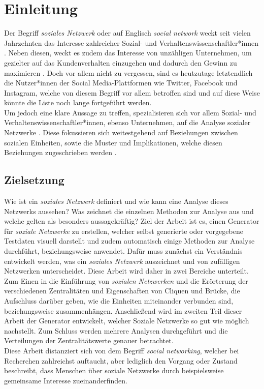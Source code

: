 \chapter{Einleitung}\label{ch:einleitung}
Der Begriff \textit{soziales Netzwerk} oder auf Englisch \textit{social network} weckt seit vielen Jahrzehnten das Interesse zahlreicher Sozial- und Verhaltenswissenschaftler*innen \cite{SNAIntroduction}. Neben diesen, weckt es zudem das Interesse von unzähligen Unternehmen, um gezielter auf das Kundenverhalten einzugehen und dadurch den Gewinn zu maximieren \cite{CompanySNA}. Doch vor allem nicht zu vergessen, sind es heutzutage letztendlich die Nutzer*innen der Social Media-Plattformen wie Twitter, Facebook und Instagram, welche von diesem Begriff vor allem betroffen sind und auf diese Weise könnte die Liste noch lange fortgeführt werden.\\
Um jedoch eine klare Aussage zu treffen, spezialisieren sich vor allem Sozial- und Verhaltenswissenschaftler*innen, ebenso Unternehmen, auf die Analyse sozialer Netzwerke \cite{SNAIntroduction, CompanySNA}. Diese fokussieren sich weitestgehend auf Beziehungen zwischen sozialen Einheiten, sowie die Muster und Implikationen, welche diesen Beziehungen zugeschrieben werden \cite{networkPattern}.


\section{Zielsetzung}\label{sec:zielsetzung}
Wie ist ein \textit{soziales Netzwerk} definiert und wie kann eine Analyse dieses Netzwerks aussehen? Was zeichnet die einzelnen Methoden zur Analyse aus und welche gelten als besonders aussagekräftig? Ziel der Arbeit ist es, einen Generator für \textit{soziale Netzwerke} zu erstellen, welcher selbst generierte oder vorgegebene Testdaten visuell darstellt und zudem automatisch einige Methoden zur Analyse durchführt, beziehungsweise anwendet. Dafür muss zunächst ein Verständnis entwickelt werden, was ein \textit{soziales Netzwerk} auszeichnet und von zufälligen Netzwerken unterscheidet.
Diese Arbeit wird daher in zwei Bereiche unterteilt. Zum Einen in die Einführung von \textit{sozialen Netzwerken} und die Erörterung der verschiedenen Zentralitäten und Eigenschaften von Cliquen und Brücke, die Aufschluss darüber geben, wie die Einheiten miteinander verbunden sind, beziehungsweise zusammenhängen. Anschließend wird im zweiten Teil dieser Arbeit der Generator entwickelt, welcher Soziale Netzwerke so gut wie möglich nachstellt. Zum Schluss werden mehrere Analysen durchgeführt und die Verteilungen der Zentralitätswerte genauer betrachtet.\\
Diese Arbeit distanziert sich von dem Begriff \textit{social networking}, welcher bei Recherchen zahlreichst auftaucht, aber lediglich den Vorgang oder Zustand beschreibt, dass Menschen über soziale Netzwerke durch beispielsweise gemeinsame Interesse zueinanderfinden. 




